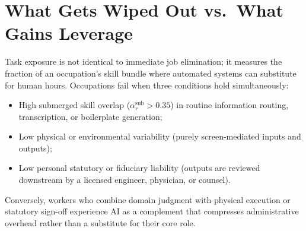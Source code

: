 \documentclass[11pt]{article}
\begin{document}
\section{What Gets Wiped Out vs.\ What Gains Leverage}
\label{sec:moats}
Task exposure is not identical to immediate job elimination; it measures the fraction of an occupation's skill bundle where automated systems can substitute for human hours. Occupations fail when three conditions hold simultaneously:
\begin{itemize}
\item High submerged skill overlap ($\alpha_r^{\text{sub}} > 0.35$) in routine information routing, transcription, or boilerplate generation;
\item Low physical or environmental variability (purely screen-mediated inputs and outputs);
\item Low personal statutory or fiduciary liability (outputs are reviewed downstream by a licensed engineer, physician, or counsel).
\end{itemize}
Conversely, workers who combine domain judgment with physical execution or statutory sign-off experience AI as a complement that compresses administrative overhead rather than a substitute for their core role.
\end{document}
